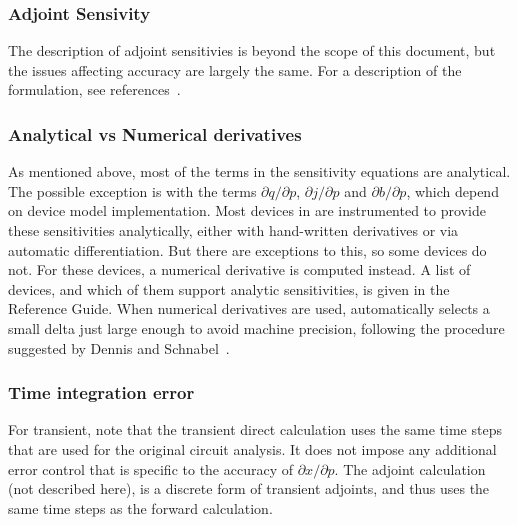 \subsubsection{Adjoint Sensivity}
The description of adjoint sensitivies is beyond the scope of this document, but the issues affecting accuracy are largely the same.  For a description of the formulation, see references~\cite{KeiterGradEnhnacedPCE2016,KeiterUQ2019}.

\subsubsection{Analytical vs Numerical derivatives}
As mentioned above, most of the terms in the sensitivity equations are analytical.  
The possible exception is with the 
terms $\partial q/\partial p$, $\partial j/\partial p$ and $\partial b/\partial p$, which 
depend on device model implementation.  Most devices in \Xyce{} are instrumented to provide 
these sensitivities analytically, either with hand-written derivatives or via automatic differentiation.
But there are exceptions to this, so some devices do not.  For these devices, a numerical 
derivative is computed instead.  A list of \Xyce{}
devices, and which of them support analytic sensitivities, is given in
the \Xyce{} Reference Guide\ReferenceGuide{}.  When numerical derivatives are used, 
\Xyce{} automatically selects a small delta just large enough to 
avoid machine precision, following the  procedure suggested by Dennis and 
Schnabel~\cite{doi:10.1137/1.9781611971200.ch5}.

\subsubsection{Time integration error}
For transient, note that the transient direct calculation uses the
same time steps that are used for the original circuit analysis.  It
does not impose any additional error control that is specific to the
accuracy of $\partial x/\partial p$.  The adjoint calculation 
(not described here), is a discrete form of transient adjoints, and thus 
uses the same time steps as the forward calculation.

